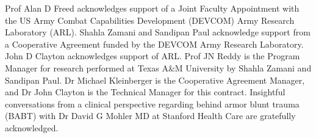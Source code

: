 \documentclass{arlticle}%
\begin{document}
\begin{createSFtwoNINEeight}
{  }
  \SFitemEIGHTEEN{\ref{TotPages}}%
\end{createSFtwoNINEeight}
%
%
%
%

\tableofcontents%
\listoffigures%
\pagebreak
\listoftables*%
\acknowledgments
Prof Alan D Freed acknowledges support of a Joint Faculty Appointment with the US Army Combat Capabilities Development (DEVCOM) Army Research Laboratory (ARL).  Shahla Zamani and Sandipan Paul acknowledge support from a Cooperative Agreement funded by the DEVCOM Army Research Laboratory.  John D Clayton acknowledges support of ARL. Prof JN Reddy is the Program Manager for research performed at Texas A\&M University by Shahla Zamani and Sandipan Paul.  Dr Michael Kleinberger is the Cooperative Agreement Manager, and Dr John Clayton is the Technical Manager for this contract.  Insightful conversations from a clinical perspective regarding behind armor blunt trauma (BABT) with Dr David G Mohler MD at Stanford Health Care are gratefully acknowledged.
\end{document}
